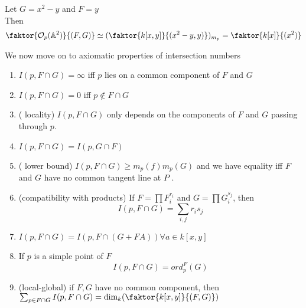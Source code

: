 \documentclass[../main.tex]{subfiles}
\begin{document}
\begin{exemple}
Let $G=x^{2}-y$ and $F=y$ \\
Then
\begin{align*}
	\faktor{\O_p( \mathbb{A}^{2}) }{( F,G) }\simeq ( \faktor{ k[x,y]}{( x^{2}-y,y) })_{m_p} = \faktor{k[x]}{( x^{2}) } 
\end{align*}

\end{exemple}
We now move on to axiomatic properties of intersection numbers	
\begin{thm}
	\begin{enumerate}
	\item $ I( p,F\cap G) = \infty $ iff $p$ lies on a common component of $F$ and $G$ 
	\item $I( p,F\cap G) =0$ iff $p\notin F\cap G$ 
	\item ( locality) $I( p,F\cap G) $ only depends on the components of $F$ and $G$ passing through $p$.
	\item $I(p, F\cap G )= I( p, G\cap F)  $ 
	\item ( lower bound) $I( p, F\cap G) \geq m_p( f) m_p( G)  $ and we have equality iff $F$ and $G$ have no common tangent line at $P$ .
	\item (compatibility with products) If $F= \prod F_i ^{r_i}$ and $G= \prod G_i ^{s_j}$, then
		\[ 
		I( p,F\cap G) = \sum_{i,j} r_i s_j
		\]
	
	\item $I( p,F\cap G) = I( p, F\cap ( G+ FA) ) \forall a \in k[x,y]$ 
	\item If $p$ is a simple point of $F$ 
		\[ 
		I( p,F\cap G) = ord_p^{F}( G) 
		\]
		
	\item (local-global) if $F,G$ have no common component, then  $\sum_{p \in F\cap G} I( p,F\cap G) = \dim_k( \faktor{k[x,y]}{( F,G) }) $ 
	\end{enumerate}
\end{thm}
\end{document}
